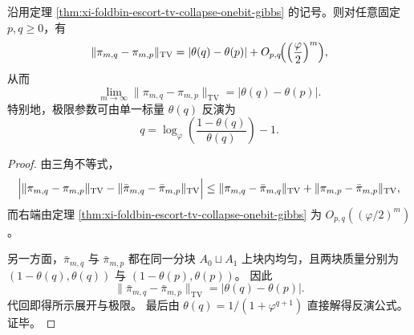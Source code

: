 \begin{theorem}\label{thm:xi-foldbin-escort-tv-identifiable-limit-distance}
沿用定理 \ref{thm:xi-foldbin-escort-tv-collapse-onebit-gibbs} 的记号。则对任意固定 \(p,q\ge 0\)，有
\[
\|\pi_{m,q}-\pi_{m,p}\|_{\mathrm{TV}}
=
|\theta(q)-\theta(p)|
+O_{p,q}\!\Bigl(\Bigl(\frac{\varphi}{2}\Bigr)^m\Bigr),
\]
从而
\[
\lim_{m\to\infty}\|\pi_{m,q}-\pi_{m,p}\|_{\mathrm{TV}}
=
|\theta(q)-\theta(p)|.
\]
特别地，极限参数可由单一标量 \(\theta(q)\) 反演为
\[
q=\log_\varphi\!\left(\frac{1-\theta(q)}{\theta(q)}\right)-1.
\]
\end{theorem}
\begin{proof}
由三角不等式，
\[
\Bigl|
\|\pi_{m,q}-\pi_{m,p}\|_{\mathrm{TV}}
-\|\bar\pi_{m,q}-\bar\pi_{m,p}\|_{\mathrm{TV}}
\Bigr|
\le
\|\pi_{m,q}-\bar\pi_{m,q}\|_{\mathrm{TV}}
+\|\pi_{m,p}-\bar\pi_{m,p}\|_{\mathrm{TV}},
\]
而右端由定理 \ref{thm:xi-foldbin-escort-tv-collapse-onebit-gibbs} 为
\(
O_{p,q}((\varphi/2)^m)
\)。

另一方面，\(\bar\pi_{m,q}\) 与 \(\bar\pi_{m,p}\) 都在同一分块 \(A_0\sqcup A_1\) 上块内均匀，且两块质量分别为
\(
(1-\theta(q),\theta(q))
\)
与
\(
(1-\theta(p),\theta(p))
\)。
因此
\[
\|\bar\pi_{m,q}-\bar\pi_{m,p}\|_{\mathrm{TV}}
=
|\theta(q)-\theta(p)|.
\]
代回即得所示展开与极限。
最后由
\(
\theta(q)=1/(1+\varphi^{q+1})
\)
直接解得反演公式。证毕。
\end{proof}


